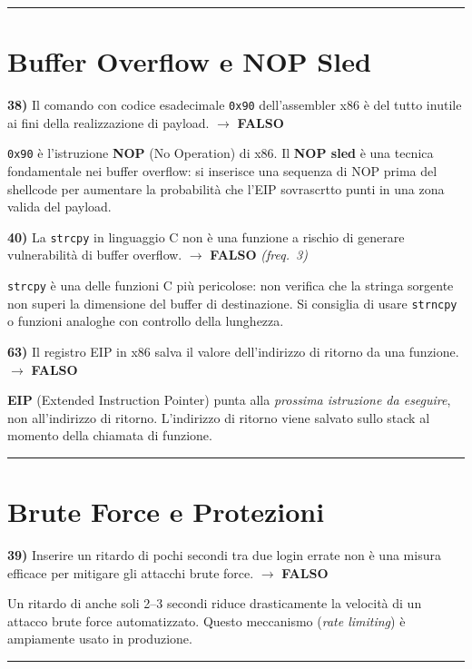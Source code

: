\documentclass[12pt, a4paper]{report}
\newcommand{\falso}{\textcolor{rossoanswer}{\textbf{FALSO}}}
\newcommand{\freq}[1]{\textcolor{freqcolor}{\textit{(freq.\ #1)}}}
\begin{document}
\noindent\rule{\textwidth}{0.4pt}

\section{Buffer Overflow e NOP Sled}

\noindent\textbf{38)} Il comando con codice esadecimale \texttt{0x90} dell'assembler x86 è del tutto inutile ai fini della realizzazione di payload. $\to$ \falso{}

\medskip
\noindent \texttt{0x90} è l'istruzione \textbf{NOP} (No Operation) di x86. Il \textbf{NOP sled} è una tecnica fondamentale nei buffer overflow: si inserisce una sequenza di NOP prima del shellcode per aumentare la probabilità che l'EIP sovrascrtto punti in una zona valida del payload.

\medskip
\noindent\textbf{40)} La \texttt{strcpy} in linguaggio C non è una funzione a rischio di generare vulnerabilità di buffer overflow. $\to$ \falso{} \freq{3}

\medskip
\noindent \texttt{strcpy} è una delle funzioni C più pericolose: non verifica che la stringa sorgente non superi la dimensione del buffer di destinazione. Si consiglia di usare \texttt{strncpy} o funzioni analoghe con controllo della lunghezza.

\medskip
\noindent\textbf{63)} Il registro EIP in x86 salva il valore dell'indirizzo di ritorno da una funzione. $\to$ \falso{}

\medskip
\noindent \textbf{EIP} (Extended Instruction Pointer) punta alla \textit{prossima istruzione da eseguire}, non all'indirizzo di ritorno. L'indirizzo di ritorno viene salvato sullo stack al momento della chiamata di funzione.

\noindent\rule{\textwidth}{0.4pt}

\section{Brute Force e Protezioni}

\noindent\textbf{39)} Inserire un ritardo di pochi secondi tra due login errate non è una misura efficace per mitigare gli attacchi brute force. $\to$ \falso{}

\medskip
\noindent Un ritardo di anche soli 2--3 secondi riduce drasticamente la velocità di un attacco brute force automatizzato. Questo meccanismo (\textit{rate limiting}) è ampiamente usato in produzione.

\noindent\rule{\textwidth}{0.4pt}
\end{document}
